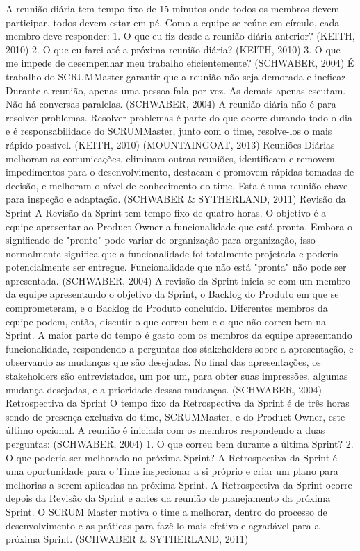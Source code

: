 A reunião diária tem tempo fixo de 15 minutos onde todos os membros devem participar, todos devem estar em pé. Como a equipe se reúne em círculo, cada membro deve responder:
1. O que eu fiz desde a reunião diária anterior? (KEITH, 2010)
2. O que eu farei até a próxima reunião diária? (KEITH, 2010)
3. O que me impede de desempenhar meu trabalho eficientemente? (SCHWABER, 2004)
É trabalho do SCRUMMaster garantir que a reunião não seja demorada e ineficaz. Durante a reunião, apenas uma pessoa fala por vez. As demais apenas escutam. Não há conversas paralelas. (SCHWABER, 2004) A reunião diária não é para resolver problemas. Resolver problemas é parte do que ocorre durando todo o dia e é responsabilidade do SCRUMMaster, junto com o time, resolve-los o mais rápido possível. (KEITH, 2010) (MOUNTAINGOAT, 2013)
Reuniões Diárias melhoram as comunicações, eliminam outras reuniões, identificam e removem impedimentos para o desenvolvimento, destacam e promovem rápidas tomadas de decisão, e melhoram o nível de conhecimento do time. Esta é uma reunião chave para inspeção e adaptação. (SCHWABER & SYTHERLAND, 2011)
Revisão da Sprint
A Revisão da Sprint tem tempo fixo de quatro horas. O objetivo é a equipe apresentar ao Product Owner a funcionalidade que está pronta. Embora o significado de "pronto" pode variar de organização para organização, isso normalmente significa que a funcionalidade foi totalmente projetada e poderia potencialmente ser entregue. Funcionalidade que não está "pronta" não pode ser apresentada. (SCHWABER, 2004)
A revisão da Sprint inicia-se com um membro da equipe apresentando o objetivo da Sprint, o Backlog do Produto em que se comprometeram, e o Backlog do Produto concluído. Diferentes membros da equipe podem, então, discutir o que correu bem e o que não correu bem na Sprint. A maior parte do tempo é gasto com os membros da equipe apresentando funcionalidade, respondendo a perguntas dos stakeholders sobre a apresentação, e observando as mudanças que são desejadas. No final das apresentações, os stakeholders ​​são entrevistados, um por um, para obter suas impressões, algumas mudança desejadas, e a prioridade dessas mudanças. (SCHWABER, 2004)
Retrospectiva da Sprint
O tempo fixo da Retrospectiva da Sprint é de três horas sendo de presença exclusiva do time, SCRUMMaster, e do Product Owner, este último opcional. A reunião é iniciada com os membros respondendo a duas perguntas: (SCHWABER, 2004)
1. O que correu bem durante a última Sprint?
2. O que poderia ser melhorado no próxima Sprint?
A Retrospectiva da Sprint é uma oportunidade para o Time inspecionar a si próprio e criar um plano para melhorias a serem aplicadas na próxima Sprint. A Retrospectiva da Sprint ocorre depois da Revisão da Sprint e antes da reunião de planejamento da próxima Sprint. O SCRUM Master motiva o time a melhorar, dentro do processo de desenvolvimento e as práticas para fazê-lo mais efetivo e agradável para a próxima Sprint. (SCHWABER & SYTHERLAND, 2011)
